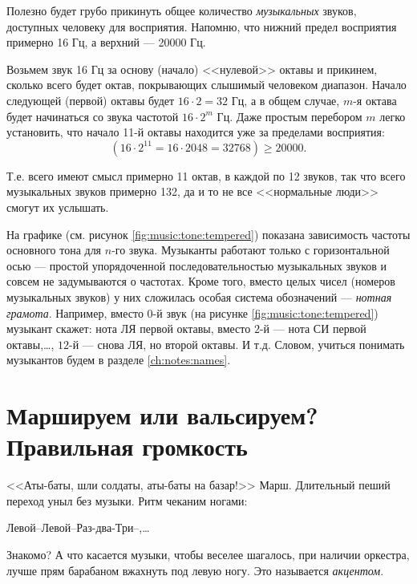 \begin{Example}
    Полезно будет грубо прикинуть общее количество \emph{музыкальных} звуков, доступных человеку для восприятия. Напомню, что нижний предел восприятия примерно 16 Гц, а верхний --- 20000 Гц. 
    
    Возьмем звук 16 Гц за основу (начало) <<нулевой>> октавы и прикинем, сколько всего будет октав, покрывающих слышимый человеком диапазон. Начало следующей (первой) октавы будет $16\cdot 2 = 32$ Гц, а в общем случае, $m$-я октава будет начинаться со звука частотой $16\cdot 2^m$ Гц. Даже простым перебором $m$ легко установить, что начало 11-й октавы находится уже за пределами восприятия: 
    \[
        (16\cdot 2^{11} = 16\cdot 2048 = 32768) \ge 20000.
    \]
    
    Т.е. всего имеют смысл примерно 11 октав, в каждой по 12 звуков, так что всего музыкальных звуков примерно 132, да и то не все <<нормальные люди>> смогут их услышать.
\end{Example}

На графике (см. рисунок \ref{fig:music:tone:tempered}) показана зависимость частоты основного тона для $n$-го звука. Музыканты работают только с горизонтальной осью --- простой упорядоченной последовательностью музыкальных звуков и совсем не задумываются о частотах. Кроме того, вместо целых чисел (номеров музыкальных звуков) у них сложилась особая система обозначений --- \emph{нотная грамота}. Например, вместо $0$-й звук (на рисунке \ref{fig:music:tone:tempered}) музыкант скажет: нота ЛЯ первой октавы, вместо $2$-й --- нота СИ первой октавы,\ldots, $12$-й --- снова ЛЯ, но второй октавы. И т.д. Словом, учиться понимать музыкантов будем в разделе \ref{ch:notes:names}.


\section{Маршируем или вальсируем? Правильная громкость}
\label{ch:music:volume}

<<Аты-баты, шли солдаты, аты-баты на базар!>> Марш. Длительный пеший переход уныл без музыки. Ритм чеканим ногами: 
\begin{center}
    Левой--Левой--Раз-два-Три--,\ldots 
\end{center}
Знакомо? А что касается музыки, чтобы веселее шагалось, при наличии оркестра, лучше прям барабаном вжахнуть под левую ногу. Это называется \emph{акцентом}. 

